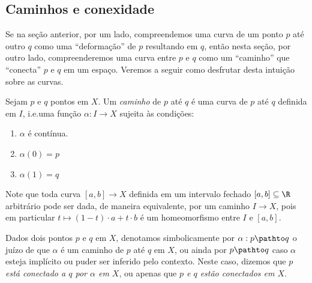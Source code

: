 \subsection{Caminhos e conexidade}

Se na seção anterior, por um lado, compreendemos uma curva de um ponto $p$ até outro $q$ como uma ``deformação'' de $p$ resultando em $q$, então nesta seção, por outro lado, compreenderemos uma curva entre $p$ e $q$ como um ``caminho'' que ``conecta'' $p$ e $q$ em um espaço. Veremos a seguir como desfrutar desta intuição sobre as curvas.

\vspace{0.5em}

\begin{definition}[(Caminhos)]
    Sejam $p$ e $q$ pontos em $X$. Um \emph{caminho} de $p$ até $q$ é uma curva de $p$ até $q$ definida em $I$, i.e.\@ uma função $\alpha : I \to X$ sujeita às condições:%
    \linebreak\vspace{-1.2em}
%
    \begin{enumerate}
    [
        itemsep=0pt,
        label={(\roman*)}
    ]
        \item
        $\alpha$ é contínua.

        \item
        $\alpha(0) = p$

        \item
        $\alpha(1) = q$
        \qedalt
    \end{enumerate}
\end{definition}

\begin{remark}
    Note que toda curva $[a, b] \to X$ definida em um intervalo fechado $[a, b] \subseteq \R$ arbitrário pode ser dada, de maneira equivalente, por um caminho $I \to X$, pois em particular $t \mapsto (1 - t) \cdot a + t \cdot b$ é um homeomorfismo entre $I$ e $[a, b]$.
    \qedalt
\end{remark}

\begin{convention}
    Dados dois pontos $p$ e $q$ em $X$, denotamos simbolicamente por $\alpha : p \pathto q$ o juízo de que $\alpha$ é um caminho de $p$ até $q$ em $X$, ou ainda por $p \pathto q$ caso $\alpha$ esteja implícito ou puder ser inferido pelo contexto. Neste caso, dizemos que \emph{$p$ está conectado a $q$ por $\alpha$ em $X$}, ou apenas que \emph{$p$ e $q$ estão conectados em $X$}.
    \qedalt
\end{convention}

